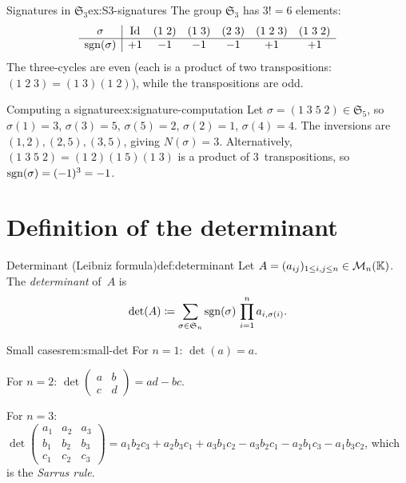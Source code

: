 \begin{example}{Signatures in $\mathfrak{S}_3$}{ex:S3-signatures}
The group $\mathfrak{S}_3$ has $3!=6$ elements:
\[
\begin{array}{c|cccccc}
  \sigma & \operatorname{Id} & (1\;2) & (1\;3) & (2\;3) & (1\;2\;3) & (1\;3\;2) \\
  \hline
  \operatorname{sgn}(\sigma) & +1 & -1 & -1 & -1 & +1 & +1
\end{array}
\]
The three-cycles are even (each is a product of two transpositions:
$(1\;2\;3)=(1\;3)(1\;2)$), while the transpositions are odd.
\end{example}

\begin{example}{Computing a signature}{ex:signature-computation}
Let $\sigma = (1\;3\;5\;2)\in\mathfrak{S}_5$, so $\sigma(1)=3$,
$\sigma(3)=5$, $\sigma(5)=2$, $\sigma(2)=1$, $\sigma(4)=4$.
The inversions are $(1,2),(2,5),(3,5)$, giving $N(\sigma)=3$.
Alternatively, $(1\;3\;5\;2)=(1\;2)(1\;5)(1\;3)$ is a product of
3~transpositions, so $\operatorname{sgn}(\sigma)=(-1)^3 = -1$.
\end{example}


\section{Definition of the determinant}\label{sec:det-definition}

\begin{definition}{Determinant (Leibniz formula)}{def:determinant}
Let $A = (a_{ij})_{1\leq i,j\leq n}\in\mathcal{M}_n({\mathbb{K}})$. The
\emph{determinant} of~$A$ is
\[
  \det(A) \coloneqq \sum_{\sigma\in\mathfrak{S}_n}
    \operatorname{sgn}(\sigma)\,\prod_{i=1}^n a_{i,\sigma(i)}.
\]
\end{definition}

\begin{remark}{Small cases}{rem:small-det}
For $n=1$: $\det(a) = a$.

For $n=2$:
$\det\begin{pmatrix} a & b \\ c & d \end{pmatrix} = ad - bc$.

For $n=3$:
$\det\begin{pmatrix} a_1 & a_2 & a_3 \\ b_1 & b_2 & b_3 \\
c_1 & c_2 & c_3 \end{pmatrix}
= a_1 b_2 c_3 + a_2 b_3 c_1 + a_3 b_1 c_2
  - a_3 b_2 c_1 - a_2 b_1 c_3 - a_1 b_3 c_2$,
which is the \emph{Sarrus rule}.
\end{remark}


